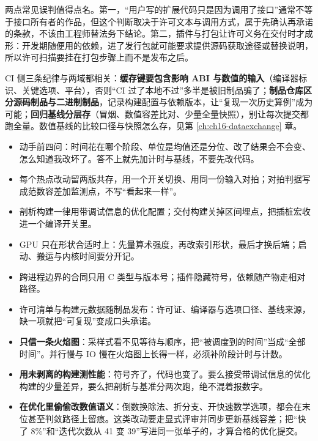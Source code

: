 \documentclass[12pt,a4paper,fontset=fandol]{ctexbook}
\newcommand{\Lang}[1]{\textsf{#1}}
\newcommand{\CL}{\Lang{C}}
\begin{document}
两点常见误判值得点名。第一，``用户写的扩展代码只是因为调用了接口''通常不等于接口所有者的作品，但这个判断取决于许可文本与调用方式，属于先确认再承诺的条款，不该由工程师替法务下结论。第二，插件与打包让许可义务在交付时才成形：开发期随便用的依赖，进了发行包就可能要求提供源码获取途径或替换说明，所以许可扫描要挂在打包步骤上而不是发布之后。

CI 侧三条纪律与两域都相关：\textbf{缓存键要包含影响 ABI 与数值的输入}（编译器标识、关键选项、平台），否则``CI 过了本地不过''多半是被旧制品骗了；\textbf{制品仓库区分源码制品与二进制制品}，记录构建配置与依赖版本，让``复现一次历史算例''成为可能；\textbf{回归基线分层存}（冒烟、数值容差比对、少量全量快照），别让每次提交都跑全量。数值基线的比较口径与快照怎么存，见第 \ref{ch:ch16-dataexchange} 章。

\begin{guideline}[title={离线与实时共用的工程纪律：可执行清单}]
\begin{itemize}
\item 动手前四问：时间花在哪个阶段、单位是均值还是分位、改了结果会不会变、怎么知道我改坏了。答不上就先加计时与基线，不要先改代码。
\item 每个热点改动留两版共存，用一个开关切换、用同一份输入对拍；对拍判据写成范数容差加监测点，不写``看起来一样''。
\item 剖析构建一律用带调试信息的优化配置；交付构建关掉区间埋点，把插桩宏收进一个编译开关里。
\item GPU 只在形状合适时上：先量算术强度，再改索引形状，最后才换后端；启动、搬运与内核时间要分开记。
\item 跨进程边界的合同只用 \CL{} 类型与版本号；插件隐藏符号，依赖随产物走相对路径。
\item 许可清单与构建元数据随制品发布：许可证、编译器与选项口径、基线来源，缺一项就把``可复现''变成口头承诺。
\end{itemize}
\end{guideline}

\begin{warning}[title={把剖析结果当结论的三种方式}]
\begin{itemize}
\item \textbf{只信一条火焰图}：采样式看不见等待与顺序，把``被调度到的时间''当成``全部时间''。并行慢与 IO 慢在火焰图上长得一样，必须补阶段计时与计数。
\item \textbf{用未剥离的构建测性能}：符号齐了，代码也变了。要么接受带调试信息的优化构建的少量差异，要么把剖析与基准分两次跑，绝不混着报数字。
\item \textbf{在优化里偷偷改数值语义}：倒数换除法、折分支、开快速数学选项，都会在末位甚至判敛路径上留痕。这类改动要走显式评审并同步更新基线容差；把``快了 8\%''和``迭代次数从 41 变 39''写进同一张单子的，才算合格的优化提交。
\end{itemize}
\end{warning}
\end{document}

